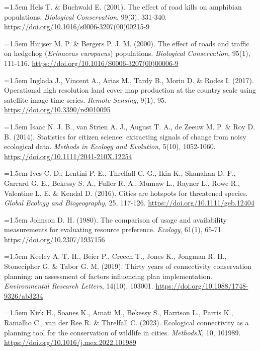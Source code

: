 \documentclass[a4paper,12pt]{report}
\begin{document}
\noindent\hangindent=1.5em Hels T. \& Buchwald E. (2001). The effect of road kills on amphibian populations. \textit{Biological Conservation}, 99(3), 331-340. \url{https://doi.org/10.1016/s0006-3207(00)00215-9}\par\medskip
\noindent\hangindent=1.5em Huijser M. P. \& Bergers P. J. M. (2000). The effect of roads and traffic on hedgehog (\textit{Erinaceus europaeus}) populations. \textit{Biological Conservation}, 95(1), 111-116. \url{https://doi.org/10.1016/S0006-3207(00)00006-9}\par\medskip
\noindent\hangindent=1.5em Inglada J., Vincent A., Arias M., Tardy B., Morin D. \& Rodes I. (2017). Operational high resolution land cover map production at the country scale using satellite image time series. \textit{Remote Sensing}, 9(1), 95. \url{https://doi.org/10.3390/rs9010095}\par\medskip
\noindent\hangindent=1.5em Isaac N. J. B., van Strien A. J., August T. A., de Zeeuw M. P. \& Roy D. B. (2014). Statistics for citizen science: extracting signals of change from noisy ecological data. \textit{Methods in Ecology and Evolution}, 5(10), 1052-1060. \url{https://doi.org/10.1111/2041-210X.12254}\par\medskip
\noindent\hangindent=1.5em Ives C. D., Lentini P. E., Threlfall C. G., Ikin K., Shanahan D. F., Garrard G. E., Bekessy S. A., Fuller R. A., Mumaw L., Rayner L., Rowe R., Valentine L. E. \& Kendal D. (2016). Cities are hotspots for threatened species. \textit{Global Ecology and Biogeography}, 25, 117-126. \url{https://doi.org/10.1111/geb.12404}\par\medskip
\noindent\hangindent=1.5em Johnson D. H. (1980). The comparison of usage and availability measurements for evaluating resource preference. \textit{Ecology}, 61(1), 65-71. \url{https://doi.org/10.2307/1937156}\par\medskip
\noindent\hangindent=1.5em Keeley A. T. H., Beier P., Creech T., Jones K., Jongman R. H., Stonecipher G. \& Tabor G. M. (2019). Thirty years of connectivity conservation planning: an assessment of factors influencing plan implementation. \textit{Environmental Research Letters}, 14(10), 103001. \url{https://doi.org/10.1088/1748-9326/ab3234}\par\medskip
\noindent\hangindent=1.5em Kirk H., Soanes K., Amati M., Bekessy S., Harrison L., Parris K., Ramalho C., van der Ree R. \& Threlfall C. (2023). Ecological connectivity as a planning tool for the conservation of wildlife in cities. \textit{MethodsX}, 10, 101989. \url{https://doi.org/10.1016/j.mex.2022.101989}\par\medskip
\end{document}
